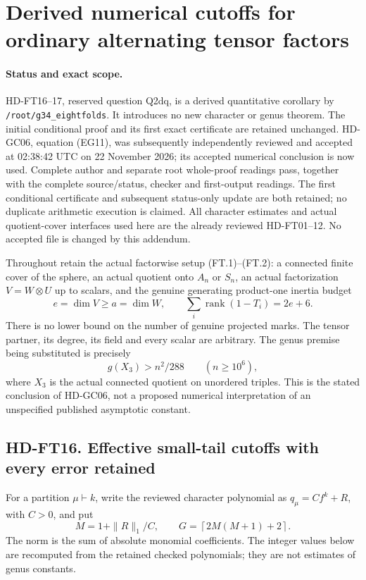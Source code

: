 \section{Derived numerical cutoffs for ordinary alternating tensor factors}
\label{sec:effective-factorwise-tail-cutoffs}

\paragraph{Status and exact scope.}
HD-FT16--17, reserved question Q2dq, is a derived quantitative
corollary by \texttt{/root/g34\_eightfolds}.  It introduces no new
character or genus theorem.  The initial conditional proof and its first
exact certificate are retained unchanged.  HD-GC06, equation (EG11),
was subsequently independently reviewed and accepted at 02:38:42 UTC
on 22 November 2026; its accepted numerical conclusion is now used.
Complete author and separate root whole-proof readings pass, together with the complete source/status, checker and first-output readings. The first conditional certificate and subsequent status-only update are both retained; no duplicate arithmetic execution is claimed.  All character estimates and
actual quotient-cover interfaces used here are the already reviewed
HD-FT01--12.  No accepted file is changed by this addendum.

Throughout retain the actual factorwise setup (FT.1)--(FT.2): a
connected finite cover of the sphere, an actual quotient onto \(A_n\)
or \(S_n\), an actual factorization \(V=W\otimes U\) up to scalars,
and the genuine generating product-one inertia budget
\[
 e=\dim V\ge a=\dim W,\qquad
                \sum_i\operatorname{rank}(1-T_i)=2e+6.
 \tag{FTE.1}
\]
There is no lower bound on the number of genuine projected marks.
The tensor partner, its degree, its field and every scalar are arbitrary.
The genus premise being substituted is precisely
\[
 g(X_3)>n^2/288\qquad(n\ge10^6),
 \tag{FTE.2}
\]
where \(X_3\) is the actual connected quotient on unordered triples.
This is the stated conclusion of HD-GC06, not a proposed numerical
interpretation of an unspecified published asymptotic constant.

\subsection*{HD-FT16. Effective small-tail cutoffs with every error retained}

For a partition \(\mu\vdash k\), write the reviewed character
polynomial as \(q_\mu=C f^k+R\), with \(C>0\), and put
\[
 M=1+\|R\|_1/C,\qquad
 G=\left\lceil2M(M+1)+2\right\rceil.
 \tag{FTE.3}
\]
The norm is the sum of absolute monomial coefficients.  The integer
values below are recomputed from the retained checked polynomials;
they are not estimates of genus constants.

